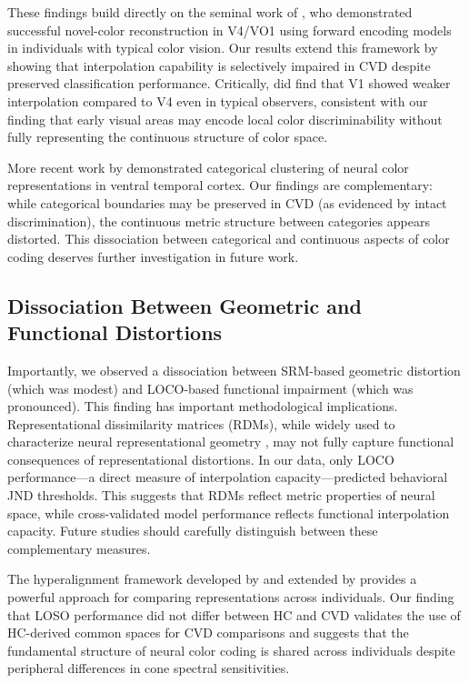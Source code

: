 These findings build directly on the seminal work of \textcite{brouwer2009}, who demonstrated successful novel-color reconstruction in V4/VO1 using forward encoding models in individuals with typical color vision. Our results extend this framework by showing that interpolation capability is selectively impaired in CVD despite preserved classification performance. Critically, \textcite{brouwer2009} did find that V1 showed weaker interpolation compared to V4 even in typical observers, consistent with our finding that early visual areas may encode local color discriminability without fully representing the continuous structure of color space.

More recent work by \textcite{brouwer2013} demonstrated categorical clustering of neural color representations in ventral temporal cortex. Our findings are complementary: while categorical boundaries may be preserved in CVD (as evidenced by intact discrimination), the continuous metric structure between categories appears distorted. This dissociation between categorical and continuous aspects of color coding deserves further investigation in future work.

\subsection{Dissociation Between Geometric and Functional Distortions}

Importantly, we observed a dissociation between SRM-based geometric distortion (which was modest) and LOCO-based functional impairment (which was pronounced). This finding has important methodological implications. Representational dissimilarity matrices (RDMs), while widely used to characterize neural representational geometry \cite{haxby2011}, may not fully capture functional consequences of representational distortions. In our data, only LOCO performance---a direct measure of interpolation capacity---predicted behavioral JND thresholds. This suggests that RDMs reflect metric properties of neural space, while cross-validated model performance reflects functional interpolation capacity. Future studies should carefully distinguish between these complementary measures.

The hyperalignment framework developed by \textcite{haxby2011} and extended by \textcite{guntupalli2016} provides a powerful approach for comparing representations across individuals. Our finding that LOSO performance did not differ between HC and CVD validates the use of HC-derived common spaces for CVD comparisons and suggests that the fundamental structure of neural color coding is shared across individuals despite peripheral differences in cone spectral sensitivities.

